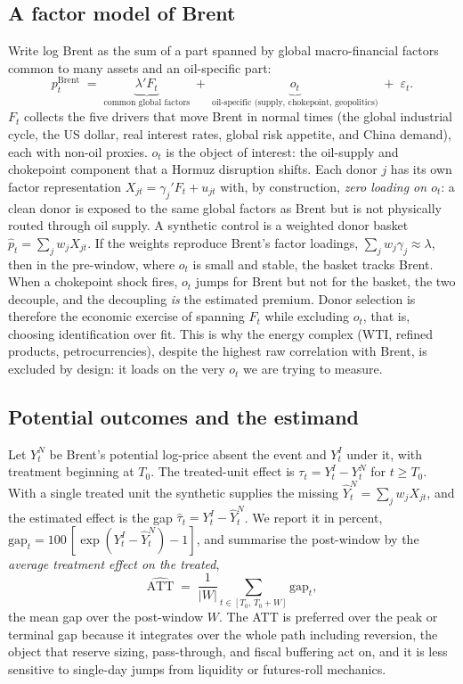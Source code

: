 \documentclass[11pt,a4paper]{article}
\newcommand{\T}{\ensuremath{T_0}}
\begin{document}
\subsection{A factor model of Brent}
Write log Brent as the sum of a part spanned by global macro-financial factors common
to many assets and an oil-specific part:
\begin{equation}
p^{\text{Brent}}_t \;=\; \underbrace{\lambda' F_t}_{\text{common global factors}}
\;+\; \underbrace{o_t}_{\text{oil-specific (supply, chokepoint, geopolitics)}}
\;+\; \varepsilon_t .
\label{eq:factor}
\end{equation}
$F_t$ collects the five drivers that move Brent in normal times (the global industrial
cycle, the US dollar, real interest rates, global risk appetite, and China demand),
each with non-oil proxies. $o_t$ is the object of interest: the oil-supply and
chokepoint component that a Hormuz disruption shifts. Each donor $j$ has its own factor
representation $X_{jt}=\gamma_j'F_t+u_{jt}$ with, by construction, \emph{zero loading on
$o_t$}: a clean donor is exposed to the same global factors as Brent but is not
physically routed through oil supply. A synthetic control is a weighted donor basket
$\hat p_t=\sum_j w_j X_{jt}$. If the weights reproduce Brent's factor loadings,
$\sum_j w_j\gamma_j\approx\lambda$, then in the pre-window, where $o_t$ is small and
stable, the basket tracks Brent. When a chokepoint shock fires, $o_t$ jumps for Brent
but not for the basket, the two decouple, and the decoupling \emph{is} the estimated
premium. Donor selection is therefore the economic exercise of spanning $F_t$ while
excluding $o_t$, that is, choosing identification over fit. This is why the energy
complex (WTI, refined products, petrocurrencies), despite the highest raw correlation
with Brent, is excluded by design: it loads on the very $o_t$ we are trying to measure.

\subsection{Potential outcomes and the estimand}
Let $Y_t^N$ be Brent's potential log-price absent the event and $Y_t^I$ under it, with
treatment beginning at \T{}. The treated-unit effect is $\tau_t=Y_t^I-Y_t^N$ for
$t\ge$\T{}. With a single treated unit the synthetic supplies the missing
$\hat Y_t^N=\sum_j w_j X_{jt}$, and the estimated effect is the gap
$\hat\tau_t=Y_t^I-\hat Y_t^N$. We report it in percent,
$\text{gap}_t=100\,[\exp(Y_t^I-\hat Y_t^N)-1]$, and summarise the post-window by the
\emph{average treatment effect on the treated},
\begin{equation}
\widehat{\text{ATT}} \;=\; \frac{1}{|W|}\sum_{t\in[\T{},\,\T{}+W]} \text{gap}_t ,
\end{equation}
the mean gap over the post-window $W$. The ATT is preferred over the peak or terminal
gap because it integrates over the whole path including reversion, the object that
reserve sizing, pass-through, and fiscal buffering act on, and it is less sensitive to
single-day jumps from liquidity or futures-roll mechanics.
\end{document}
